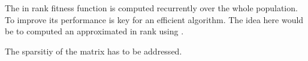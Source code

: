\documentclass{iSWAGArticle}
\begin{document}
The in rank fitness function is computed recurrently over the whole population. To improve its performance is key for an efficient
algorithm. The idea here would be to computed an approximated in rank using \cite{}.

The sparsitiy of the matrix has to be addressed.





\end{document}
